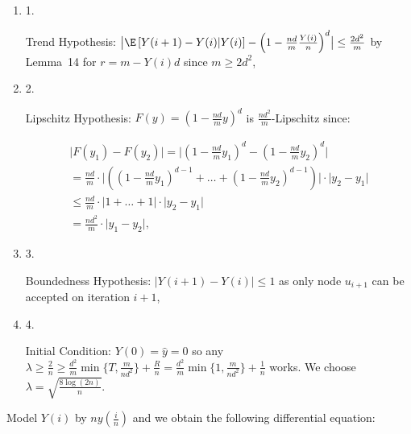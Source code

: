 \documentclass[10pt,a4paper]{article}
\begin{document}
\begin{enumerate}


\item[] 1. 


Trend Hypothesis: $\bigl|\E\left[Y(i+1)-Y(i)\middle|Y(i)\right]-\left(1-\frac{nd}{m}\frac{Y(i)}{n}\right)^{d}\bigr|\leq\frac{2d^{2}}{m}$ by Lemma 14 for $r=m-Y(i)d$ since $m\geq 2d^{2}$,\par




\item[] 2. 


Lipschitz Hypothesis: $F(y)=\left(1-\frac{nd}{m}y\right)^{d}$ is $\frac{nd^{2}}{m}$-Lipschitz since:\par


\[\begin{gathered}
\displaystyle\bigl|F(y_{1})-F(y_{2})\bigr| \displaystyle=\bigl|\left(1-\frac{nd}{m}y_{1}\right)^{d}-\left(1-\frac{nd}{m}y_{2}\right)^{d}\bigr| \\
\displaystyle=\frac{nd}{m}\cdot\bigl|\left(\left(1-\frac{nd}{m}y_{1}\right)^{d-1}+\dots+\left(1-\frac{nd}{m}y_{2}\right)^{d-1}\right)\bigr|\cdot\bigl|y_{2}-y_{1}\bigr| \\
\displaystyle\leq\frac{nd}{m}\cdot\bigl|1+\dots+1\bigr|\cdot\bigl|y_{2}-y_{1}\bigr| \\
\displaystyle=\frac{nd^{2}}{m}\cdot\bigl|y_{1}-y_{2}\bigr|,
\end{gathered}\]




\item[] 3. 


Boundedness Hypothesis: $\bigl|Y(i+1)-Y(i)\bigr|\leq 1$ as only node $u_{i+1}$ can be accepted on iteration $i+1$,\par




\item[] 4. 


Initial Condition: $Y(0)=\hat{y}=0$ so any $\lambda\geq\frac{2}{n}\geq\frac{d^{2}}{m}\min\{T,\frac{m}{nd^{2}}\}+\frac{R}{n}=\frac{d^{2}}{m}\min\{1,\frac{m}{nd^{2}}\}+\frac{1}{n}$ works. We choose $\lambda=\sqrt{\frac{8\log{(2n)}}{n}}$.\par




\end{enumerate}




Model $Y(i)$ by $ny\left(\frac{i}{n}\right)$ and we obtain the following differential equation:\par
\end{document}
